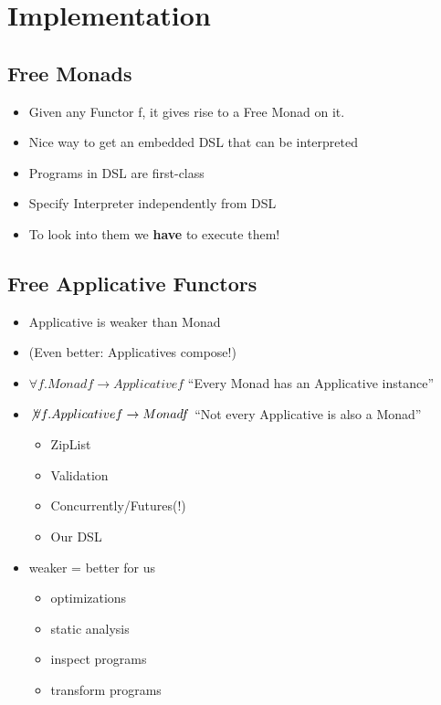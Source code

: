 \chapter{Implementation}
\label{cha:implementation}

\section{Free Monads}
\label{sec:free-monads}

\begin{itemize}
\item Given any Functor f, it gives rise to a Free Monad on it.
\item Nice way to get an embedded DSL that can be interpreted
\item Programs in DSL are first-class
\item Specify Interpreter independently from DSL
\item To look into them we \textbf{have} to execute them!
\end{itemize}

\section{Free Applicative Functors}
\label{sec:free-appl-funct}

\begin{itemize}
\item Applicative is weaker than Monad
\item (Even better: Applicatives compose!)
\item $\forall f. Monad f \rightarrow Applicative f$
  ``Every Monad has an Applicative instance''
\item $\not \forall f. Applicative f \rightarrow Monad f$
  ``Not every Applicative is also a Monad''
  \begin{itemize}
  \item ZipList
  \item Validation
  \item Concurrently/Futures(!)
  \item Our DSL
  \end{itemize}
\item weaker = better for us
  \begin{itemize}
  \item optimizations
  \item static analysis
  \item inspect programs
  \item transform programs
  \end{itemize}
\end{itemize}

